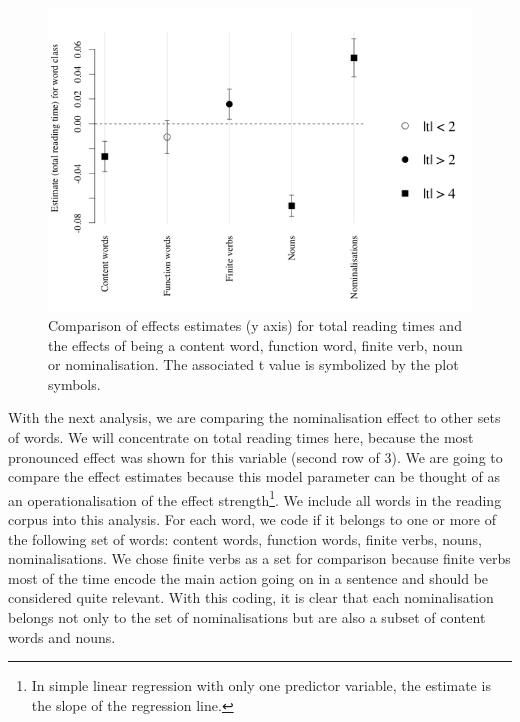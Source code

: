 \documentclass[output=paper]{langsci/langscibook}
\begin{document}
 
\begin{figure}
 \includegraphics[width=\textwidth]{figures/Wolfer1.png}
\caption{Comparison of effects estimates (y axis) for total reading times and the effects of being a content word, function word, finite verb, noun or nominalisation. The associated t value is symbolized by the plot symbols.}
 \label{wolfer:fig:1}
\end{figure} 


With the next analysis, we are comparing the nominalisation effect to other sets of words. We will concentrate on total reading times here, because the most pronounced effect was shown for this variable (second row of 3). We are going to compare the effect estimates because this model parameter can be thought of as an operationalisation of the effect strength\footnote{In simple linear regression with only one predictor variable, the estimate is the slope of the regression line.}. We include all words in the reading corpus into this analysis. For each word, we code if it belongs to one or more of the following set of words: content words, function words, finite verbs, nouns, nominalisations. We chose finite verbs as a set for comparison because finite verbs most of the time encode the main action going on in a sentence and should be considered quite relevant. With this coding, it is clear that each nominalisation belongs not only to the set of nominalisations but are also a subset of content words and nouns. 
\end{document}

